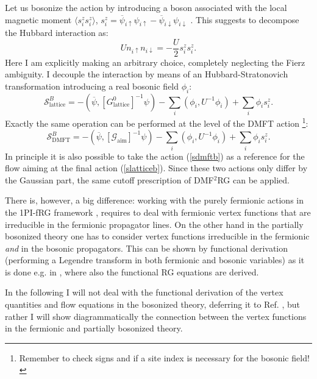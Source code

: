 \documentclass[a4paper,11pt]{article}
\begin{document}
Let us bosonize the action by introducing a boson associated with the local magnetic moment $\langle s^z_i s^z_i \rangle$, $s^z_i = \overline \psi_{i\uparrow}\psi_{i\uparrow}-\overline \psi_{i\downarrow}\psi_{i\downarrow}$ . 
This suggests to decompose the Hubbard interaction as: 
\begin{equation}
Un_{i\uparrow}n_{i\downarrow}=-\frac{U}{2}s^z_i s^z_i.  
\end{equation}   
Here I am explicitly making an arbitrary choice, completely neglecting the Fierz ambiguity\cite{Baier2004}. 
I decouple the interaction by means of an Hubbard-Stratonovich transformation introducing a real bosonic field $\phi_i$: 
\begin{equation}
\label{slatticeb}
\mathcal{S}^B_{\mathrm{lattice}}= -(\overline \psi, [G^0_{\mathrm{lattice}}]^{-1}\psi)-\sum_i(\phi_i,U^{-1}\phi_i)+\sum_i \phi_i s^z_i.
\end{equation}  
Exactly the same operation can be performed at the level of the DMFT action
\footnote{Remember to check signs and if a site index is necessary for the bosonic field!}: 
\begin{equation}
\label{sdmftb}
\mathcal{S}^B_{\mathrm{DMFT}} = -(\overline \psi, [\mathcal{G}_{\mathrm{aim}}]^{-1}\psi)-\sum_i(\phi_i,U^{-1}\phi_i)+\sum_i \phi_i s^z_i.
\end{equation} 
In principle it is also possible to take the action (\ref{sdmftb}) as a reference for the flow aiming at the final action (\ref{slatticeb}). Since these two actions only differ by the Gaussian part, the same cutoff prescription of DMF$^2$RG \cite{Taranto2014} can be applied. 

There is, however, a big difference: working with the purely fermionic actions in the 1PI-fRG framework \cite{Metzner2012}, requires to deal with fermionic vertex functions that are irreducible in the fermionic propagator lines. On the other hand in the partially bosonized theory one has to consider vertex functions irreducible in the fermionic {\sl and} in the bosonic propagators. This can be shown by functional derivation (performing a Legendre transform in both fermionic and bosonic variables) as it is done e.g. in \cite{Schuetz2004}, where also the functional RG equations are derived. 

In the following I will not deal with the functional derivation of the vertex quantities and flow equations in the bosonized theory, deferring it to Ref. \cite{Schuetz2004}, but rather I will show diagrammatically the connection between the vertex functions in the fermionic and partially bosonized theory. 
\end{document}

